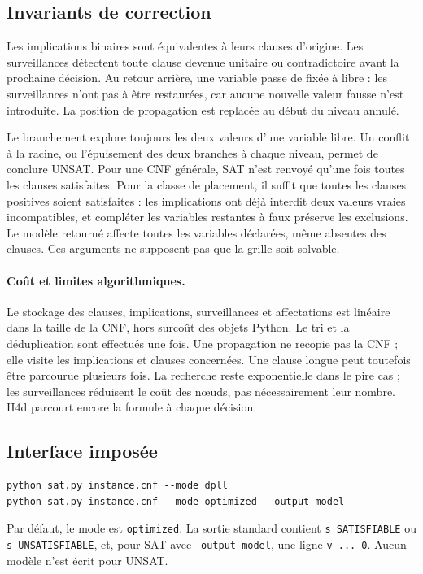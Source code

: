 \documentclass[10pt,a4paper]{article}
\begin{document}
\subsection{Invariants de correction}

Les implications binaires sont équivalentes à leurs clauses d'origine.
Les surveillances détectent toute clause devenue unitaire ou contradictoire
avant la prochaine décision. Au retour arrière, une variable passe de
fixée à libre : les surveillances n'ont pas à être restaurées, car aucune
nouvelle valeur fausse n'est introduite. La position de propagation est
replacée au début du niveau annulé.

Le branchement explore toujours les deux valeurs d'une variable libre.
Un conflit à la racine, ou l'épuisement des deux branches à chaque niveau,
permet de conclure UNSAT. Pour une CNF générale, SAT n'est renvoyé qu'une
fois toutes les clauses satisfaites. Pour la classe de placement, il
suffit que toutes les clauses positives soient satisfaites : les
implications ont déjà interdit deux valeurs vraies incompatibles, et
compléter les variables restantes à faux préserve les exclusions.
Le modèle retourné affecte toutes les variables déclarées, même absentes
des clauses. Ces arguments ne supposent pas que la grille soit solvable.

\paragraph{Coût et limites algorithmiques.} Le stockage des clauses,
implications, surveillances et affectations est linéaire dans la taille
de la CNF, hors surcoût des objets Python. Le tri et la déduplication sont
effectués une fois. Une propagation ne recopie pas la CNF ; elle visite
les implications et clauses concernées. Une clause longue peut toutefois
être parcourue plusieurs fois. La recherche reste exponentielle dans le
pire cas ; les surveillances réduisent le coût des nœuds, pas nécessairement
leur nombre. H4d parcourt encore la formule à chaque décision.

\subsection{Interface imposée}

\begin{lstlisting}
python sat.py instance.cnf --mode dpll
python sat.py instance.cnf --mode optimized --output-model
\end{lstlisting}
Par défaut, le mode est \texttt{optimized}. La sortie standard contient
\texttt{s SATISFIABLE} ou
\texttt{s UNSATISFIABLE}, et, pour SAT avec \texttt{--output-model}, une
ligne \texttt{v ... 0}. Aucun modèle n'est écrit pour UNSAT.
\end{document}
